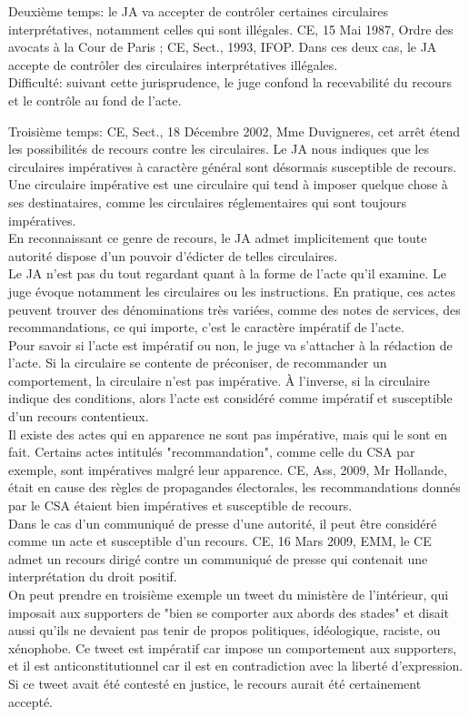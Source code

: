\documentclass[10pt, a4paper, openany]{book}
\begin{document}
Deuxième temps: le JA va accepter de contrôler certaines circulaires interprétatives, notamment celles qui sont illégales. CE, 15 Mai 1987, Ordre des avocats à la Cour de Paris ; CE, Sect., 1993, IFOP. Dans ces deux cas, le JA accepte de contrôler des circulaires interprétatives illégales. \\
Difficulté: suivant cette jurisprudence, le juge confond la recevabilité du recours et le contrôle au fond de l'acte. 


Troisième temps: CE, Sect., 18 Décembre 2002, Mme Duvigneres, cet arrêt étend les possibilités de recours contre les circulaires. Le JA nous indiques que les circulaires impératives à caractère général sont désormais susceptible de recours. \\
Une circulaire impérative est une circulaire qui tend à imposer quelque chose à ses destinataires, comme les circulaires réglementaires qui sont toujours impératives. \\
En reconnaissant ce genre de recours, le JA admet implicitement que toute autorité dispose d'un pouvoir d'édicter de telles circulaires. \\
Le JA n'est pas du tout regardant quant à la forme de l'acte qu'il examine. Le juge évoque notamment les circulaires ou les instructions. En pratique, ces actes peuvent trouver des dénominations très variées, comme des notes de services, des recommandations, ce qui importe, c'est le caractère impératif de l'acte. \\
Pour savoir si l'acte est impératif ou non, le juge va s'attacher à la rédaction de l'acte. Si la circulaire se contente de préconiser, de recommander un comportement, la circulaire n'est pas impérative. À l'inverse, si la circulaire indique des conditions, alors l'acte est considéré comme impératif et susceptible d'un recours contentieux. \\
Il existe des actes qui en apparence ne sont pas impérative, mais qui le sont en fait. Certains actes intitulés "recommandation", comme celle du CSA par exemple, sont impératives malgré leur apparence. CE, Ass, 2009, Mr Hollande, était en cause des règles de propagandes électorales, les recommandations donnés par le CSA étaient bien impératives et susceptible de recours. \\
Dans le cas d'un communiqué de presse d'une autorité, il peut être considéré comme un acte et susceptible d'un recours. CE, 16 Mars 2009, EMM, le CE admet un recours dirigé contre un communiqué de presse qui contenait une interprétation du droit positif. \\
On peut prendre en troisième exemple un tweet du ministère de l'intérieur, qui imposait aux supporters de "bien se comporter aux abords des stades" et disait aussi qu'ils ne devaient pas tenir de propos politiques, idéologique, raciste, ou xénophobe. Ce tweet est impératif car impose un comportement aux supporters, et il est anticonstitutionnel car il est en contradiction avec la liberté d'expression. Si ce tweet avait été contesté en justice, le recours aurait été certainement accepté.
\end{document}
